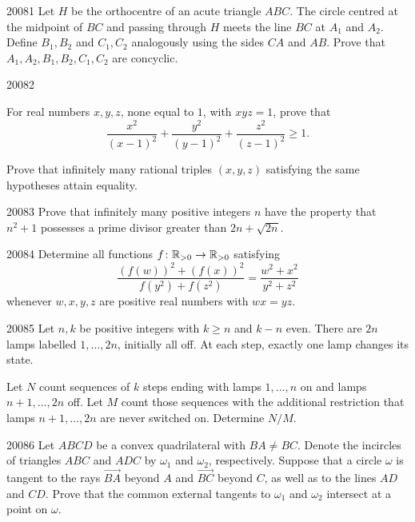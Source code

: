 
\begin{problem}{2008}{1}
Let $H$ be the orthocentre of an acute triangle $ABC$. The circle centred at the midpoint of $BC$ and passing through $H$ meets the line $BC$ at $A_1$ and $A_2$. Define $B_1, B_2$ and $C_1, C_2$ analogously using the sides $CA$ and $AB$. Prove that $A_1, A_2, B_1, B_2, C_1, C_2$ are concyclic.
\end{problem}

\begin{problem}{2008}{2}
\begin{problemsubparts}
    \item For real numbers $x, y, z$, none equal to $1$, with $xyz=1$, prove that
    \[
        \frac{x^2}{(x-1)^2}+\frac{y^2}{(y-1)^2}+\frac{z^2}{(z-1)^2}\geq1.
    \]
    \item Prove that infinitely many rational triples $(x, y, z)$ satisfying the same hypotheses attain equality.
\end{problemsubparts}
\end{problem}

\begin{problem}{2008}{3}
Prove that infinitely many positive integers $n$ have the property that $n^2+1$ possesses a prime divisor greater than $2n+\sqrt{2n}$.
\end{problem}

\begin{problem}{2008}{4}
Determine all functions $f\colon\mathbb{R}_{>0}\to\mathbb{R}_{>0}$ satisfying
\[
    \frac{(f(w))^2+(f(x))^2}{f(y^2)+f(z^2)}=\frac{w^2+x^2}{y^2+z^2}
\]
whenever $w, x, y, z$ are positive real numbers with $wx=yz$.
\end{problem}

\begin{problem}{2008}{5}
Let $n, k$ be positive integers with $k\geq n$ and $k-n$ even. There are $2n$ lamps labelled $1, \dots, 2n$, initially all off. At each step, exactly one lamp changes its state.

Let $N$ count sequences of $k$ steps ending with lamps $1, \dots, n$ on and lamps $n+1, \dots, 2n$ off. Let $M$ count those sequences with the additional restriction that lamps $n+1, \dots, 2n$ are never switched on. Determine $N/M$.
\end{problem}

\begin{problem}{2008}{6}
Let $ABCD$ be a convex quadrilateral with $BA\ne BC$. Denote the incircles of triangles $ABC$ and $ADC$ by $\omega_1$ and $\omega_2$, respectively. Suppose that a circle $\omega$ is tangent to the rays $\overrightarrow{BA}$ beyond $A$ and $\overrightarrow{BC}$ beyond $C$, as well as to the lines $AD$ and $CD$. Prove that the common external tangents to $\omega_1$ and $\omega_2$ intersect at a point on $\omega$.
\end{problem}
